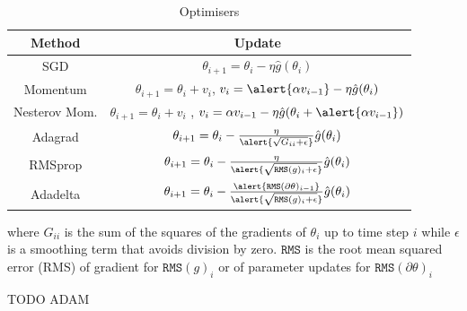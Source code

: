 \documentclass[xcolor=pdftex,dvipsnames,table,mathserif]{beamer}
\begin{document}
\begin{frame}
\begin{table}[htp]
\caption{Optimisers}
\begin{center}
\begin{tabular}{|c|c|} \hline
Method & Update\\ \hline
SGD  & $\theta_{i+1}= \theta_{i}-\eta\hat{g}(\theta_{i})$ \\ \hline
Momentum    & $\theta_{i+1}= \theta_{i}+v_i$, $v_{i}= \alert{\alpha v_{i-1}} -\eta \hat{g}(\theta_{i}) $ \\  \hline
Nesterov Mom.  &  $\theta_{i+1}= \theta_{i}+v_i$ , $v_i= \alpha v_{i-1} -\eta\hat{g}(\theta_{i}+ \alert{\alpha v_{i-1}}) $\\ \hline
Adagrad & $\theta_{i+1}= \theta_{i}- \frac{\eta}{\alert{\sqrt { G_{ii}+\epsilon  }}} \hat{g}(\theta_{i})$  \\ \hline
RMSprop & $\theta_{i+1}= \theta_{i}- \frac{\eta}{\alert{\sqrt { \texttt{RMS}(g)_{i}+\epsilon  }}} \hat{g}(\theta_{i})$  \\ \hline
Adadelta & $ \theta_{i+1}= \theta_{i}- \frac{\alert{ \texttt{RMS}(\partial\theta)_{i-1}}}{\alert{\sqrt { \texttt{RMS}(g)_{i}+\epsilon  }}} \hat{g}(\theta_{i})
$ \\ \hline
\end{tabular}
\end{center}
\label{default}
\end{table}%
where $G_{ii}$ is the sum of the squares of the gradients of $\theta_i$ up to time step $i$ while $\epsilon$ is a smoothing term that avoids division by zero.
$\texttt{RMS}$ is the root mean squared error  (RMS)  of gradient for $\texttt{RMS}(g)_{i}$ or of parameter updates for $\texttt{RMS}(\partial \theta)_{i}$ 
\end{frame}

\begin{frame}{TODO ADAM}
\end{frame}


\end{document}
